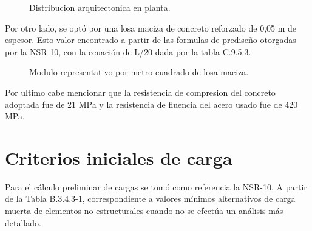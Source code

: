 ﻿\documentclass[12pt,letterpaper]{article}
\begin{document}
\begin{figure}[H]
    \caption{Distribucion arquitectonica en planta.}
    \label{fig:distribucion}
\end{figure}

Por otro lado, se optó por una losa maciza de concreto reforzado de 0,05 m de espesor. Esto valor encontrado a partir de las formulas de prediseño otorgadas por la NSR-10, con la ecuación de L/20 dada por la tabla C.9.5.3.

\begin{figure}[H]
    \centering
    \caption{Modulo representativo por metro cuadrado de losa maciza.}
    \label{fig:modulo-nervio}
\end{figure}

Por ultimo cabe mencionar que la resistencia de compresion del concreto adoptada fue de 21 MPa y la resistencia de fluencia del acero usado fue de 420 MPa.
\section{Criterios iniciales de carga}
\label{sec:cargas}

Para el cálculo preliminar de cargas se tomó como referencia la NSR-10. A partir de la Tabla B.3.4.3-1, correspondiente a valores mínimos alternativos de carga muerta de elementos no estructurales cuando no se efectúa un análisis más detallado.
\end{document}
